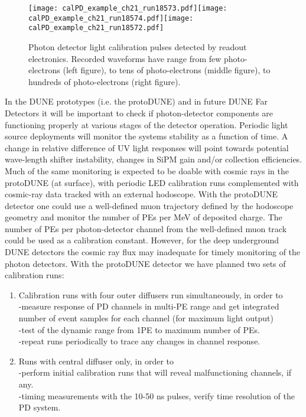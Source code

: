 %
 \begin{figure}[hhh!!!]
  \centering
\texttt{[image: calPD\_example\_ch21\_run18573.pdf]}\texttt{[image: calPD\_example\_ch21\_run18574.pdf]}\texttt{[image: calPD\_example\_ch21\_run18572.pdf]}
\caption{Photon detector light calibration pulses detected by readout electronics. Recorded waveforms have range from few photo-electrons (left figure), to tens of photo-electrons (middle figure), to hundreds of photo-electrons (right figure).}
\label{fig:fig-wf}
\end{figure}
%
In the DUNE prototypes (i.e. the protoDUNE) and in future DUNE Far Detectors it will be important to check if photon-detector components are functioning properly at various stages of the detector operation. 
Periodic light source deployments will monitor the systems stability as a function of time. A change in relative difference of UV light responses will point towards potential wave-length shifter instability, 
changes in SiPM gain and/or collection efficiencies. Much of the same monitoring is expected to be doable with cosmic rays in the protoDUNE (at surface), with periodic LED calibration runs complemented 
with cosmic-ray data tracked with an external hodoscope. With the protoDUNE detector one could use a well-defined muon trajectory defined by the hodoscope geometry and monitor the number 
of PEs per MeV of deposited charge. The number of PEs per photon-detector channel from the well-defined muon track could be used as a calibration constant. However, for the deep underground DUNE detectors the cosmic ray flux may inadequate for timely monitoring of the photon detectors.
	With the protoDUNE detector we have planned two sets of calibration runs: 
\begin{enumerate}
\item Calibration runs with four outer diffusers run simultaneously, in order to\\
-measure response of PD channels in multi-PE range and get integrated number of event samples for each channel (for maximum light output)\\
-test of the dynamic range from 1PE to maximum number of PEs. \\ 
-repeat runs periodically to trace any changes in channel response.
      
\item Runs with central diffuser only, in order to\\
-perform initial calibration runs that will reveal malfunctioning channels, if any.\\
-timing measurements with the 10-50 ns pulses, verify time resolution of the PD system.
\end{enumerate}

